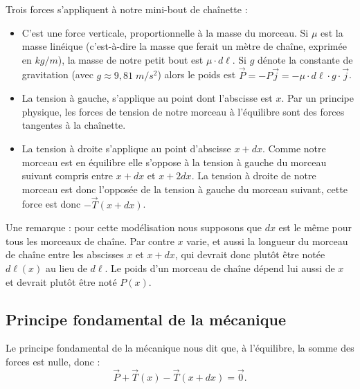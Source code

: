 \documentclass[class=report,crop=false]{standalone}
\begin{document}
Trois forces s'appliquent à notre mini-bout de chaînette :
\shorthandoff{:}
\shorthandon{:}
\begin{itemize}
 \item {} C'est une force verticale, proportionnelle à la masse du morceau.
Si $\mu$ est la masse linéique (c'est-à-dire la masse que ferait un mètre de chaîne, exprimée en $kg/m$),
la masse de notre petit bout est $\mu \cdot d\ell$.
Si $g$ dénote la constante de gravitation (avec $g \approx 9,81 \; m/s^2$) alors le poids est $\vec P = -P \vec j = - \mu\cdot d\ell \cdot g \cdot \vec j$.

 \item {} La tension à gauche, s'applique au point dont l'abscisse est $x$.
 Par un principe physique, les forces de tension de notre morceau à l'équilibre sont
des forces tangentes à la chaînette. 

 \item  {} La tension à droite s'applique au point d'abscisse $x+dx$.
Comme notre morceau est en équilibre elle s'oppose à la tension à gauche du morceau suivant compris entre $x+dx$ et 
$x + 2dx$. La tension à droite de notre morceau est donc l'opposée de la tension à gauche du morceau suivant, 
cette force est donc $-\vec T(x+dx)$.
\end{itemize}

\bigskip

Une remarque : pour cette modélisation nous supposons que $dx$ est le même pour tous les morceaux de chaîne.
Par contre $x$ varie, et aussi la longueur du morceau de chaîne entre les abscisses $x$ et $x+dx$, 
qui devrait donc plutôt être 
notée $d\ell(x)$ au lieu de $d\ell$. 
Le poids d'un morceau de chaîne dépend lui aussi de $x$ et devrait plutôt être noté $P(x)$.


\subsection{Principe fondamental de la mécanique}

Le principe fondamental de la mécanique nous dit que, à l'équilibre, la somme des forces est nulle, donc :
\begin{equation}
\label{eq:fond}
\vec P + \vec T(x)-\vec T(x+dx) = \vec 0. 
\end{equation}
\end{document}
